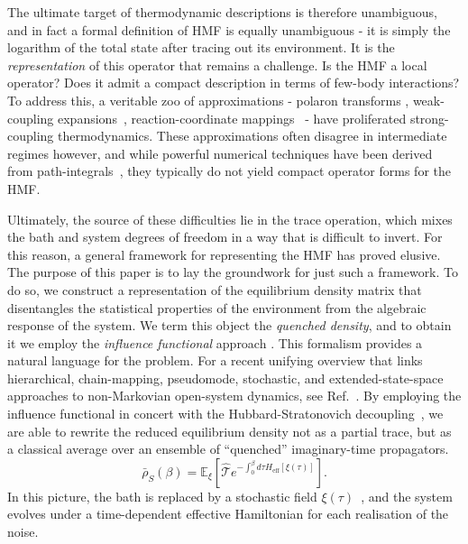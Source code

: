 The ultimate target of thermodynamic descriptions is therefore unambiguous, and in fact a formal definition of HMF is equally unambiguous - it is simply the logarithm of the total state after tracing out its environment. It is the \emph{representation} of this operator that remains a challenge. Is the HMF a local operator? Does it admit a compact description in terms of few-body interactions? To address this, a veritable zoo of approximations - polaron transforms \cite{jangNonequilibriumTheoryElectronic2008}, weak-coupling expansions~\cite{cresserWeakUltrastrongCoupling2021a}, reaction-coordinate mappings~ \cite{ShubrookIlesSmithNazir2025, duGeneralizedHamiltonianMeanforce2025a,nazirReactionCoordinateMapping2018,AntoSztrikacsNazirSegal2023,IlesSmithDijkstraLambertNazir2016} - have proliferated strong-coupling thermodynamics. These approximations often disagree in intermediate regimes however, and while powerful numerical techniques have been derived from path-integrals~\cite{moixEquilibriumreducedDensityMatrix2012,chenRigorousStochasticMatrix2014,makriExploitingClassicalDecoherence2014,tanimuraReducedHierarchicalEquations2014,songCalculationCorrelatedInitial2015,WaltersWang2024}, they typically do not yield compact operator forms for the HMF.

Ultimately, the source of these difficulties lie in the trace operation, which mixes the bath and system degrees of freedom in a way that is difficult to invert. For this reason, a general framework for representing the HMF has proved elusive. The purpose of this paper is to lay the groundwork for just such a framework. To do so, we construct a representation of the equilibrium density matrix that disentangles the statistical properties of the environment from the algebraic response of the system. We term this object the \emph{quenched density}, and to obtain it we employ the \emph{influence functional} approach \cite{feynmanTheoryGeneralQuantum1963a,caldeiraQuantumTunnellingDissipative1983a,grabertQuantumBrownianMotion1988}. This formalism provides a natural language for the problem. For a recent unifying overview that links hierarchical, chain-mapping, pseudomode, stochastic, and extended-state-space approaches to non-Markovian open-system dynamics, see Ref.~\cite{XuVadimovStockburgerAnkerhold2026}. By employing the influence functional in concert with the Hubbard-Stratonovich decoupling~\cite{hubbardCalculationPartitionFunctions1959a,stratonovich1957QDistro,stockburgerExactNumberRepresentation2002}, we are able to rewrite the reduced equilibrium density not as a partial trace, but as a classical average over an ensemble of ``quenched'' imaginary-time propagators.
\begin{equation}
    \bar{\rho}_S(\beta) = \mathbb{E}_{\xi}\left[ \hat{\mathcal{T}} e^{-\int_0^\beta d\tau H_{\mathrm{eff}}[\xi(\tau)]} \right].
\end{equation}
In this picture, the bath is replaced by a stochastic field $\xi(\tau)$~\cite{stockburgerSimulatingSpinbosonDynamics2004,mccaulPartitionfreeApproachOpen2017c,wiedmannNonMarkovianDynamicsQuantum2020,laneExactlyThermalizedQuantum2020,matosEfficientChoiceColored2020,matosStochasticEntropyProduction2022}, and the system evolves under a time-dependent effective Hamiltonian for each realisation of the noise.

